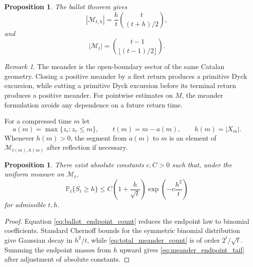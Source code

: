 \documentclass[11pt]{amsart}
\numberwithin{equation}{section}
\theoremstyle{plain}
\newtheorem{proposition}[theorem]{Proposition}
\theoremstyle{definition}
\theoremstyle{remark}
\newtheorem{remark}[theorem]{Remark}
\newcommand{\Mert}{M}
\newcommand{\Pp}{\mathbb{P}}
\begin{document}
\begin{proposition}
\label{prop:ballot_meander_count}
The ballot theorem gives
\begin{equation}
\left|\mathcal{M}_{t,h}\right|
=
\frac{h}{t}
\binom{t}{(t+h)/2},
\label{eq:ballot_endpoint_count}
\end{equation}
and
\begin{equation}
\left|\mathcal{M}_t\right|
=
\binom{t-1}{\lfloor (t-1)/2\rfloor}.
\label{eq:total_meander_count}
\end{equation}
\end{proposition}

\begin{remark}
\label{rem:meander_as_open_catalan}
The meander is the open-boundary sector of the same Catalan geometry.  Closing a positive meander by a first return produces a primitive Dyck excursion, while cutting a primitive Dyck excursion before its terminal return produces a positive meander.  For pointwise estimates on $\Mert$, the meander formulation avoids any dependence on a future return time.
\end{remark}

For a compressed time $m$ let
\begin{equation}
a(m)=\max\{z_r:z_r\le m\},
\qquad
t(m)=m-a(m),
\qquad
h(m)=|X_m|.
\label{eq:last_zero_coordinates}
\end{equation}
Whenever $h(m)>0$, the segment from $a(m)$ to $m$ is an element of $\mathcal{M}_{t(m),h(m)}$ after reflection if necessary.

\begin{proposition}
\label{prop:meander_gaussian_tail}
There exist absolute constants $c,C>0$ such that, under the uniform measure on $\mathcal{M}_t$,
\begin{equation}
\Pp_t\{S_t\ge h\}
\le
C\left(1+\frac{h}{\sqrt t}\right)
\exp\!\left(-c\frac{h^2}{t}\right)
\label{eq:meander_endpoint_tail}
\end{equation}
for admissible $t,h$.
\end{proposition}

\begin{proof}
Equation \eqref{eq:ballot_endpoint_count} reduces the endpoint law to binomial coefficients.  Standard Chernoff bounds for the symmetric binomial distribution give Gaussian decay in $h^2/t$, while \eqref{eq:total_meander_count} is of order $2^t/\sqrt t$.  Summing the endpoint masses from $h$ upward gives \eqref{eq:meander_endpoint_tail} after adjustment of absolute constants.
\end{proof}
\end{document}

